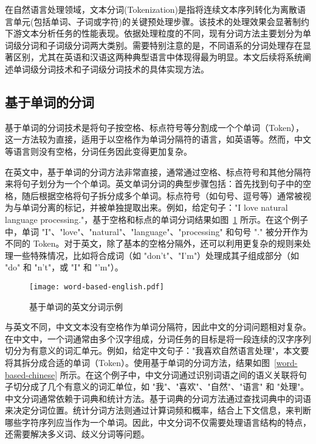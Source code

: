 在自然语言处理领域，文本分词(Tokenization)是指将连续文本序列转化为离散语言单元(包括单词、子词或字符)的关键预处理步骤。该技术的处理效果会显著制约下游文本分析任务的性能表现。依据处理粒度的不同，现有分词方法主要划分为单词级分词和子词级分词两大类别。需要特别注意的是，不同语系的分词处理存在显著区别，尤其在英语和汉语这两种典型语言中体现得最为明显。本文后续将系统阐述单词级分词技术和子词级分词技术的具体实现方法。

\subsection{基于单词的分词}

基于单词的分词技术是将句子按空格、标点符号等分割成一个个单词（Token），这一方法较为直接，适用于以空格作为单词分隔符的语言，如英语等。然而，中文等语言则没有空格，分词任务因此变得更加复杂。

在英文中，基于单词的分词方法非常直接，通常通过空格、标点符号和其他分隔符来将句子划分为一个个单词。英文单词分词的典型步骤包括：首先找到句子中的空格，随后根据空格将句子拆分成多个单词。标点符号（如句号、逗号等）通常被视为与单词分离的标记，并被单独提取出来。例如，给定句子："I love natural language processing."，基于空格和标点的单词分词结果如图~\ref{word-based-english} 所示。在这个例子中，单词 "I"、"love"、"natural"、"language"、"processing" 和句号 "." 被分开作为不同的 Token。对于英文，除了基本的空格分隔外，还可以利用更复杂的规则来处理一些特殊情况，比如将合成词（如 "don't"、"I'm"）处理成其子组成部分（如 "do" 和 "n't"，或 "I" 和 "'m"）。

\begin{figure}[ht]
  \centering
  \texttt{[image: word-based-english.pdf]}
  \caption{基于单词的英文分词示例}
  \label{word-based-english}
\end{figure}

与英文不同，中文文本没有空格作为单词分隔符，因此中文的分词问题相对复杂。在中文中，一个词通常由多个汉字组成，分词任务的目标是将一段连续的汉字序列切分为有意义的词汇单元。例如，给定中文句子："我喜欢自然语言处理"，本文要将其拆分成合适的单词（Token）。使用基于单词的分词方法，结果如图~\ref{word-based-chinese} 所示。在这个例子中，中文分词通过识别词语之间的语义关联将句子切分成了几个有意义的词汇单位，如 "我"、"喜欢"、"自然"、"语言" 和 "处理"。中文分词通常依赖于词典和统计方法。基于词典的分词方法通过查找词典中的词语来决定分词位置。统计分词方法则通过计算词频和概率，结合上下文信息，来判断哪些字符序列应当作为一个单词。因此，中文分词不仅需要处理语言结构的特点，还需要解决多义词、歧义分词等问题。

